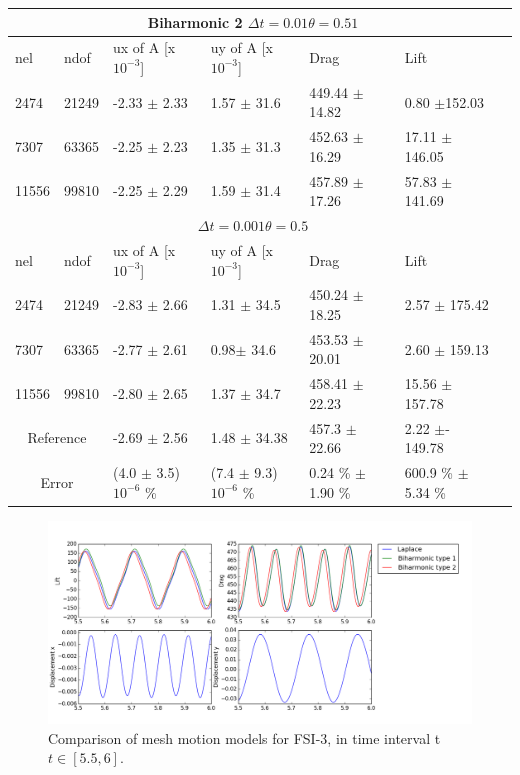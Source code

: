 \begin{table}[h!]
\centering
\label{my-label}
\begin{tabular}{ |p{1cm}||p{1cm}|p{3.2cm}|p{3.2cm}|p{2.9cm}|p{3.1cm}|p{1.2cm}|}
 \hline
  \multicolumn{6}{|c|}{Biharmonic 2 \hspace{2mm}  $\Delta t = 0.01 \theta = 0.51$} \\
   \hline
nel & ndof & ux of A [x $10^{-3}$]  &uy of A [x $10^{-3}$]& Drag  & Lift \\
 \hline
 2474    & 21249  &-2.33 $\pm$ 2.33 & 1.57 $\pm$ 31.6    & 449.44  $\pm$ 14.82 & 0.80  $\pm$152.03  \\
 7307    & 63365  & -2.25 $\pm$ 2.23 &  1.35 $\pm$ 31.3  & 452.63     $\pm$16.29 & 17.11     $\pm$  146.05 \\
 11556   & 99810  & -2.25  $\pm$ 2.29 & 1.59  $\pm$ 31.4 & 457.89   $\pm$ 17.26 & 57.83      $\pm$  141.69 \\
 \hline
  \multicolumn{6}{|c|}{$\Delta t = 0.001 \theta = 0.5$} \\
   \hline
 nel & ndof & ux of A [x $10^{-3}$]  &uy of A [x $10^{-3}$]& Drag  & Lift \\
 2474    & 21249  & -2.83 $\pm$ 2.66   & 1.31 $\pm$ 34.5  &  450.24    $\pm$  18.25 & 2.57  $\pm$   175.42  \\
 7307    & 63365  & -2.77 $\pm$ 2.61    & 0.98$\pm$  34.6 & 453.53    $\pm$ 20.01 & 2.60   $\pm$ 159.13  \\
 11556   & 99810  & -2.80  $\pm$ 2.65 & 1.37 $\pm$ 34.7 & 458.41  $\pm$ 22.23 & 15.56   $\pm$  157.78 \\
 \hline
 \multicolumn{2}{|c|}{Reference} & -2.69 $\pm$  2.56                    & 1.48  $\pm$  34.38                   & 457.3  $\pm$  22.66        & 2.22  $\pm$- 149.78           \\
 \hline
 \multicolumn{2}{|c|}{Error}  & (4.0 $\pm$ 3.5)$10^{-6}$ \% & (7.4 $\pm$ 9.3)$10^{-6}$ \% & 0.24 \% $\pm$ 1.90 \% & 600.9 \% $\pm$ 5.34 \% \\
 \hline
\end{tabular}
\end{table}

\newpage

\begin{figure}[h!]
    \includegraphics[scale=0.5]{./Fig/fsi3compare.png}
      \caption{Comparison of mesh motion models for FSI-3, in time interval t $t \in [5.5, 6]$.}
\end{figure}

